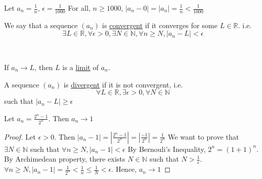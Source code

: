 \documentclass[11pt]{article}
\begin{document}
\begin{example}
    Let \(a_n = \frac{1}{n}\), \(\epsilon = \frac{1}{1000}\)
    For all, \(n \geqslant 1000\), \(|a_n - 0| = |a_n| = \frac{1}{n} < \frac{1}{1000}\)
\end{example}

\begin{center}
\end{center}
\begin{definition}
    We say that a sequence \((a_n)\) is \underline{convergent} if it converges for some \(L \in \mathbb{R}\). i.e.
    \[\exists L \in \mathbb{R}, \forall \epsilon > 0, \exists N \in \mathbb{N}, \forall n \geqslant N, \mid a_n - L \mid < \epsilon\]
\end{definition}\

\begin{definition}
    If \(a_n \rightarrow L\), then \(L\) is a \underline{limit} of \(a_n\).
\end{definition}

\begin{definition}
    A sequence \((a_n)\) is \underline{divergent} if it is not convergent, i.e.
    \[\forall L \in \mathbb{R}, \exists \epsilon > 0, \forall N \in \mathbb{N}\] such that \(|a_n - L| \geqslant \epsilon\)
\end{definition}

\begin{example}
    Let \(a_n = \frac{2^n - 1}{2^n}\). Then \(a_n \rightarrow 1\)
\end{example}
\begin{proof}
    Let \(\epsilon > 0\). Then \(|a_n - 1| = |\frac{2^n - 1}{2^n}| = |\frac{-1}{2^n}| = \frac{1}{2^n}\)
    We want to prove that \(\exists N \in \mathbb{N}\) such that \(\forall n \geqslant N, |a_n - 1| < \epsilon\)
    By Bernouli's Inequality, \(2^n = {(1 + 1)}^n.\)
    By Archimedean property, there exists \(N \in \mathbb{N}\) such that \(N > \frac{1}{\epsilon}\).
    \(\forall n \geqslant N, |a_n - 1| = \frac{1}{2^n} < \frac{1}{n} \leqslant \frac{1}{N} < \epsilon\). Hence, \(a_n \rightarrow 1\)
\end{proof}
\end{document}
